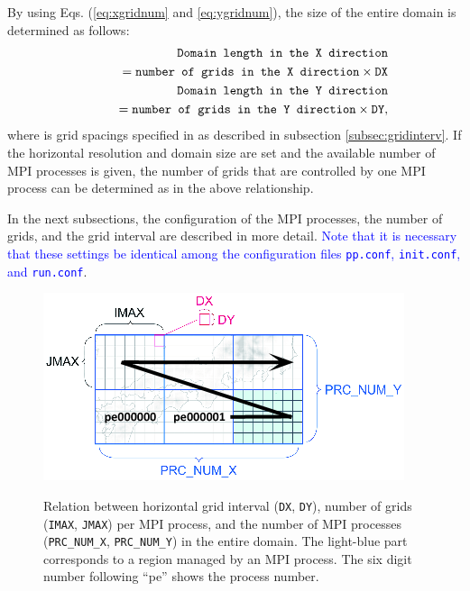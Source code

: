 By using Eqs. (\ref{eq:xgridnum} and \ref{eq:ygridnum}),  the size of the entire domain is determined as follows:
\begin{eqnarray}
&& \verb|Domain length in the X direction| \nonumber\\
&&    \qquad = \verb|number of grids in the X direction| \times \verb|DX|\\
&& \verb|Domain length in the Y direction| \nonumber\\
&&    \qquad = \verb|number of grids in the Y direction| \times \verb|DY|,
\end{eqnarray}
where  is grid spacings specified  in  as described in subsection \ref{subsec:gridinterv}.
If the horizontal resolution and domain size are set and the available number of MPI processes is given, the number of grids that are controlled by one MPI process can be determined as in the above relationship.

In the next subsections, the configuration of the MPI processes, the number of grids, and the grid interval are described in more detail.  \textcolor{blue}{Note that it is necessary that these settings  be identical among the configuration files \texttt{pp.conf},  \texttt{init.conf}, and \texttt{run.conf}}.

\begin{figure}[h]
\begin{center}
  \includegraphics[width=0.8\hsize]{./figure/domain_decomposition_v2.png}\\
  \caption{Relation between horizontal grid interval (\texttt{DX}, \texttt{DY}),
   number of grids (\texttt{IMAX}, \texttt{JMAX}) per MPI process,
   and the number of MPI processes (\texttt{PRC\_NUM\_X}, \texttt{PRC\_NUM\_Y}) in the entire domain.
   The light-blue part corresponds to a region managed by an MPI process.
   The six digit number following ``pe'' shows the process number.}
  \label{fig:domain}
\end{center}
\end{figure}

